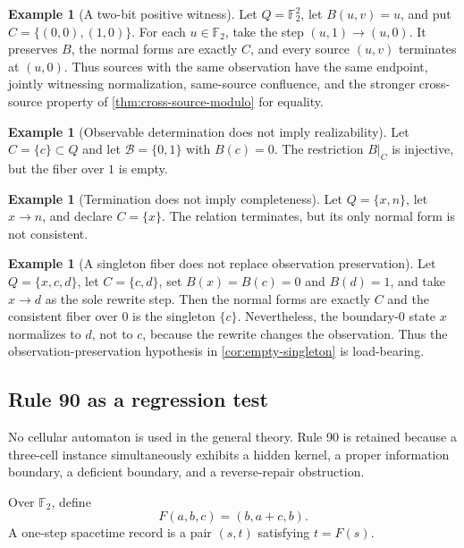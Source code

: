 \documentclass[11pt]{article}
\theoremstyle{definition}
\newtheorem{example}[theorem]{Example}
\theoremstyle{remark}
\numberwithin{equation}{section}
\newcommand{\cB}{\mathcal B}
\begin{document}
\begin{example}[A two-bit positive witness]\label{ex:two-bit-positive}
Let $Q=\mathbb F_2^2$, let $B(u,v)=u$, and put
$C=\{(0,0),(1,0)\}$.  For each $u\in\mathbb F_2$, take the step
$(u,1)\to(u,0)$.  It preserves $B$, the normal forms
are exactly $C$, and every source $(u,v)$ terminates at $(u,0)$.  Thus sources
with the same observation have the same endpoint, jointly witnessing
normalization, same-source confluence, and the stronger cross-source property
of \cref{thm:cross-source-modulo} for equality.
\end{example}

\begin{example}[Observable determination does not imply realizability]
Let $C=\{c\}\subset Q$ and let $\cB=\{0,1\}$ with $B(c)=0$.  The restriction $B|_C$ is injective, but the fiber over $1$ is empty.
\end{example}

\begin{example}[Termination does not imply completeness]
Let $Q=\{x,n\}$, let $x\to n$, and declare $C=\{x\}$.  The relation terminates, but its only normal form is not consistent.
\end{example}

\begin{example}[A singleton fiber does not replace observation preservation]
Let $Q=\{x,c,d\}$, let $C=\{c,d\}$, set
$B(x)=B(c)=0$ and $B(d)=1$, and take $x\to d$ as the sole rewrite step.
Then the normal forms are exactly $C$ and the consistent fiber over $0$ is the
singleton $\{c\}$.  Nevertheless, the boundary-$0$ state $x$ normalizes to
$d$, not to $c$, because the rewrite changes the observation.  Thus the
observation-preservation hypothesis in \cref{cor:empty-singleton} is
load-bearing.
\end{example}

\subsection{Rule 90 as a regression test}\label{sec:rule90}

No cellular automaton is used in the general theory.  Rule 90 is retained because a three-cell instance simultaneously exhibits a hidden kernel, a proper information boundary, a deficient boundary, and a reverse-repair obstruction.

Over $\mathbb F_2$, define
\[
 F(a,b,c)=(b,a+c,b).
\]
A one-step spacetime record is a pair $(s,t)$ satisfying $t=F(s)$.
\end{document}
